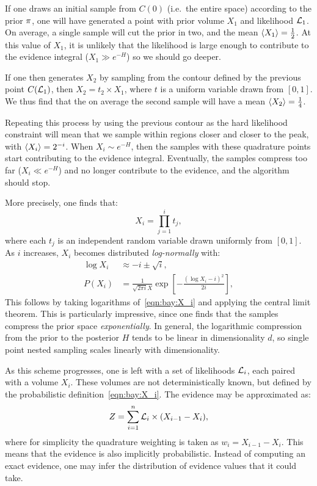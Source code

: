 If one draws an initial sample from $C(0)$ (i.e.\ the entire space) according to the prior $\pi$, one will have generated a point with prior volume $X_1$ and likelihood $\mathcal{L}_1$. On average, a single sample will cut the prior in two, and the mean ${\left\langle{X_1}\right\rangle}=\frac{1}{2}$. At this value of $X_1$, it is unlikely that the likelihood is large enough to contribute to the evidence integral ($X_1\gg e^{-H}$) so we should go deeper.

If one then generates $X_2$ by sampling from the contour defined by the previous point $C(\mathcal{L}_1)$, then $X_2=t_2\times X_1$, where $t$ is a uniform variable drawn from $[0,1]$. We thus find that the on average the second sample will have a mean ${\left\langle{X_2}\right\rangle} = \frac{1}{4}$. 

Repeating this process by using the previous contour as the hard likelihood constraint will mean that we sample within regions closer and closer to the peak, with ${\left\langle{X_i}\right\rangle} = 2^{-i}$. When $X_i\sim e^{-H}$, then the samples with these quadrature points start contributing to the evidence integral. Eventually, the samples compress too far ($X_i\ll e^{-H}$) and no longer contribute to the evidence, and the algorithm should stop.

More precisely, one finds that:
\begin{equation}
  X_i = \prod_{j=1}^i t_j,
  \label{eqn:bay:X_i}
\end{equation}
where each $t_j$ is an independent random variable drawn uniformly from $[0,1]$. As $i$ increases, $X_i$ becomes distributed {\em log-normally\/} with:
\begin{align}
  \log X_i  &\approx -i \pm \sqrt{i},
  \label{eqn:bay:log_normal_1_1}
  \\
  P(X_i) &= \frac{1}{\sqrt{2\pi i} X}\exp\left[ -\frac{{\left( \log X_i - i \right)}^2}{2 i}  \right],
  \label{eqn:bay:log_normal_1_2}
\end{align}
This follows by taking logarithms of~\eqref{eqn:bay:X_i} and applying the central limit theorem. This is particularly impressive, since one finds that the samples compress the prior space {\em exponentially}. In general, the logarithmic compression from the prior to the posterior $H$ tends to be linear in dimensionality $d$, so single point nested sampling scales linearly with dimensionality.

As this scheme progresses, one is left with a set of likelihoods $\mathcal{L}_i$, each paired with a volume $X_i$. These volumes are not deterministically known, but defined by the probabilistic definition~\eqref{eqn:bay:X_i}. The evidence may be approximated as:
\begin{equation}
  Z = \sum_{i=1}^n \mathcal{L}_i \times (X_{i-1}-X_{i}),
  \label{eqn:bay:ev_sum}
\end{equation}
where for simplicity the quadrature weighting is taken as $w_i = X_{i-1}-X_i$. This means that the evidence is also implicitly probabilistic. Instead of computing an exact evidence, one may infer the distribution of evidence values that it could take.

